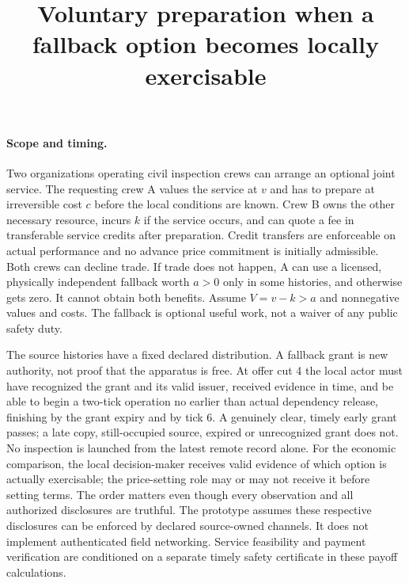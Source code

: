 \documentclass{article}
\title{Voluntary preparation when a fallback option becomes locally exercisable}
\date{}
\begin{document}
\maketitle

\paragraph{Scope and timing.}
Two organizations operating civil inspection crews can arrange an optional joint service. The requesting crew A values the service at $v$ and has to prepare at irreversible cost $c$ before the local conditions are known. Crew B owns the other necessary resource, incurs $k$ if the service occurs, and can quote a fee in transferable service credits after preparation. Credit transfers are enforceable on actual performance and no advance price commitment is initially admissible. Both crews can decline trade. If trade does not happen, A can use a licensed, physically independent fallback worth $a>0$ only in some histories, and otherwise gets zero. It cannot obtain both benefits. Assume $V=v-k>a$ and nonnegative values and costs. The fallback is optional useful work, not a waiver of any public safety duty.

The source histories have a fixed declared distribution. A fallback grant is new authority, not proof that the apparatus is free. At offer cut 4 the local actor must have recognized the grant and its valid issuer, received evidence in time, and be able to begin a two-tick operation no earlier than actual dependency release, finishing by the grant expiry and by tick 6. A genuinely clear, timely early grant passes; a late copy, still-occupied source, expired or unrecognized grant does not. No inspection is launched from the latest remote record alone. For the economic comparison, the local decision-maker receives valid evidence of which option is actually exercisable; the price-setting role may or may not receive it before setting terms. The order matters even though every observation and all authorized disclosures are truthful. The prototype assumes these respective disclosures can be enforced by declared source-owned channels. It does not implement authenticated field networking. Service feasibility and payment verification are conditioned on a separate timely safety certificate in these payoff calculations.
\end{document}
